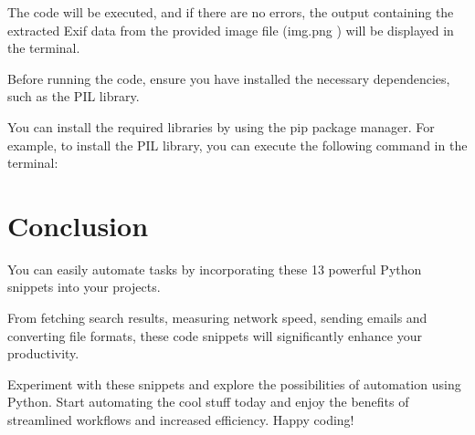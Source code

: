 The code will be executed, and if there are no errors, the output containing the extracted Exif data from the provided image file (img.png ) will be displayed in the terminal.

Before running the code, ensure you have installed the necessary dependencies, such as the PIL library.

You can install the required libraries by using the pip package manager. For example, to install the PIL library, you can execute the following command in the terminal:

\section{Conclusion}

You can easily automate tasks by incorporating these 13 powerful Python snippets into your projects.

From fetching search results, measuring network speed, sending emails and converting file formats, these code snippets will significantly enhance your productivity.

Experiment with these snippets and explore the possibilities of automation using Python. Start automating the cool stuff today and enjoy the benefits of streamlined workflows and increased efficiency. Happy coding!
